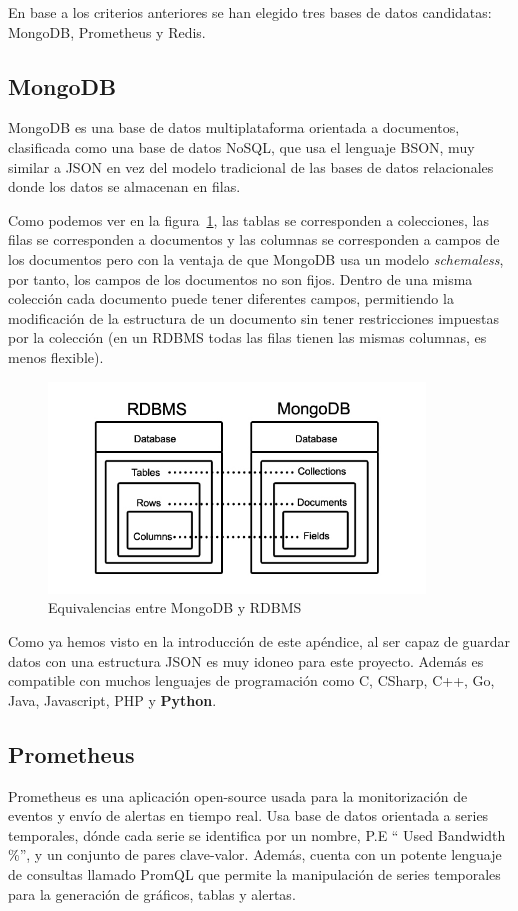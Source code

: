 En base a los criterios anteriores se han elegido tres bases de datos candidatas: MongoDB,
Prometheus y Redis.

\subsection{MongoDB}
MongoDB es una base de datos multiplataforma orientada a documentos, clasificada como una base de 
datos NoSQL, que usa el lenguaje BSON, muy similar a JSON en vez del modelo tradicional de las 
bases de datos relacionales donde los datos se almacenan en filas. 

Como podemos ver en la figura~\ref{fig:Mongo_vs_RDBMS}, las tablas se corresponden a colecciones,
las filas se corresponden a documentos y las columnas se corresponden a campos de los documentos
pero con la ventaja de que MongoDB usa un modelo \textit{schemaless}, por tanto, los campos de los
documentos no son fijos. Dentro de una misma colección cada documento puede tener diferentes campos,
permitiendo la modificación de la estructura de un documento sin tener restricciones impuestas por
la colección (en un RDBMS todas las filas tienen las mismas columnas, es menos flexible). 


\begin{figure}
    \centering
    \includegraphics[width=10cm]{graphics/MongoDB_vs_RMSBD}
    \caption{Equivalencias entre MongoDB y RDBMS}
    \label{fig:Mongo_vs_RDBMS}
\end{figure}

Como ya hemos visto en la introducción de este apéndice, al ser capaz de guardar datos con una
estructura JSON es muy idoneo para este proyecto. Además es compatible con muchos lenguajes de 
programación como C, CSharp, C++, Go, Java, Javascript, PHP y \textbf{Python}.
\subsection{Prometheus}
Prometheus \cite{prometheus} es una aplicación open-source usada para la
monitorización de eventos y envío de alertas en tiempo real. Usa base de datos orientada a series
temporales, dónde cada serie se identifica por un nombre, P.E \enquote{ Used Bandwidth \%}, y un
conjunto de pares clave-valor. Además, cuenta con un potente lenguaje de consultas llamado PromQL
que permite la manipulación de series temporales para la generación de gráficos, tablas y alertas.


